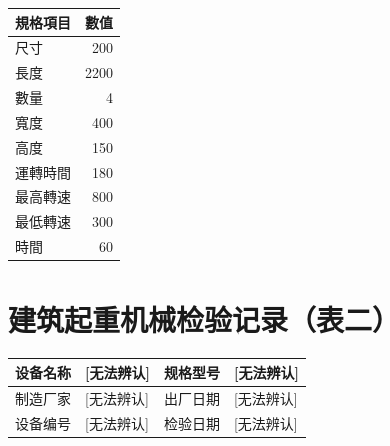 \documentclass[UTF8,10pt,a4paper,fontset=fandol]{ctexart}
\newcommand{\fieldvalue}[1]{#1}
\newcommand{\handwritten}[1]{#1}
\begin{document}
\vspace{1em}

\begin{tabularx}{\textwidth}{|l|r|}
\hline
規格項目 & 數值 \\
\hline
尺寸 & 200 \\
\hline
長度 & 2200 \\
\hline
數量 & 4 \\
\hline
寬度 & 400 \\
\hline
高度 & 150 \\
\hline
運轉時間 & 180 \\
\hline
最高轉速 & 800 \\
\hline
最低轉速 & 300 \\
\hline
時間 & 60 \\
\hline
\end{tabularx}


\newpage

\section*{建筑起重机械检验记录（表二）}

\noindent
\begin{tabularx}{\textwidth}{|l|X|l|X|}
\hline
设备名称 & 
\fieldvalue{\handwritten{[无法辨认]}} &
规格型号 &
\fieldvalue{\handwritten{[无法辨认]}} \\
\hline
制造厂家 &
\fieldvalue{\handwritten{[无法辨认]}} &
出厂日期 &
\fieldvalue{\handwritten{[无法辨认]}} \\
\hline
设备编号 &
\fieldvalue{\handwritten{[无法辨认]}} &
检验日期 &
\fieldvalue{\handwritten{[无法辨认]}} \\
\hline
\end{tabularx}
\end{document}
